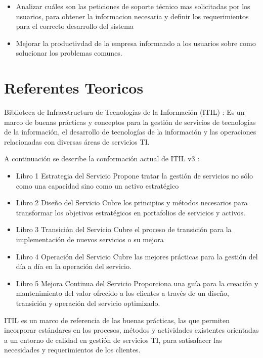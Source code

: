 \documentclass[preprint,12pt]{elsarticle}
\begin{document}
\begin{itemize}

\item Analizar cuáles son las peticiones de soporte técnico mas solicitadas por los usuarios, para obtener la informacion necesaria y definir los requerimientos para el correcto desarrollo del sistema
\item Mejorar la productivdad de la empresa informando a los usuarios sobre como solucionar los problemas comunes.
\end{itemize}


 


\section{Referentes Teoricos}
Biblioteca de Infraestructura de Tecnologías de la Información (ITIL) : Es un marco de buenas prácticas y conceptos para la gestión de servicios de tecnologías de la información, el desarrollo de tecnologías de la información y las operaciones relacionadas con diversas áreas de servicios TI.

A continuación se describe la conformación actual de ITIL v3 :
\begin{itemize}
\item Libro 1  Estrategia del Servicio 
Propone tratar la gestión de servicios no sólo como una capacidad sino como un activo estratégico
\item Libro 2 Diseño del Servicio
Cubre los principios y métodos necesarios para transformar los objetivos estratégicos en portafolios de servicios y activos.
\item Libro 3 Transición del Servicio
Cubre el proceso de transición para la implementación de nuevos servicios o su mejora
\item Libro 4 Operación del Servicio
Cubre las mejores prácticas para la gestión del día a día en la operación del servicio.
\item Libro 5 Mejora Continua del Servicio
Proporciona una guía para la creación y mantenimiento del valor ofrecido a los clientes a través de un diseño, transición y operación del servicio optimizado.
\end{itemize}
ITIL es un marco de referencia de las buenas prácticas, las que permiten incorporar estándares en los procesos, métodos y actividades existentes orientadas a un entorno de calidad en gestión de servicios TI, para satisafacer las necesidades y requerimientos de los clientes.
\end{document}
